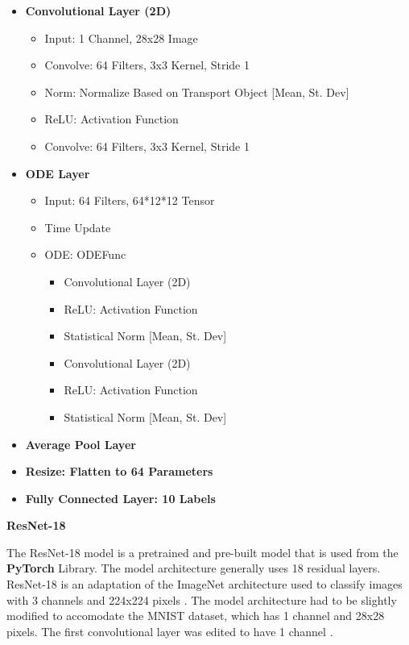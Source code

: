 \documentclass{article}
\begin{document}
\begin{itemize}
   \item \textbf{Convolutional Layer (2D)}
   \begin{itemize}
      \item Input: 1 Channel, 28x28 Image
      \item Convolve: 64 Filters, 3x3 Kernel, Stride 1
      \item Norm: Normalize Based on Transport Object [Mean, St. Dev]
      \item ReLU: Activation Function
      \item Convolve: 64 Filters, 3x3 Kernel, Stride 1
   \end{itemize}
   \item \textbf{ODE Layer}
   \begin{itemize}
      \item Input: 64 Filters, 64*12*12 Tensor
      \item Time Update
      \item ODE: ODEFunc
      \begin{itemize}
         \item Convolutional Layer (2D)
         \item ReLU: Activation Function
         \item Statistical Norm [Mean, St. Dev]
         \item Convolutional Layer (2D)
         \item ReLU: Activation Function
         \item Statistical Norm [Mean, St. Dev]
      \end{itemize}
   \end{itemize}
   \item \textbf{Average Pool Layer}
   \item \textbf{Resize: Flatten to 64 Parameters}
   \item \textbf{Fully Connected Layer: 10 Labels}
\end{itemize}

\textbf{ResNet-18}

The ResNet-18 model is a pretrained and pre-built model that is used from the \textbf{PyTorch} Library.
The model architecture generally uses 18 residual layers. ResNet-18 is an adaptation of the
ImageNet architecture used to classify images with 3 channels and 224x224 pixels \cite{23AI}. The model
architecture had to be slightly modified to accomodate the MNIST dataset, which has 1 channel and 28x28 pixels.
The first convolutional layer was edited to have 1 channel \cite{19Shorten}.
\end{document}
